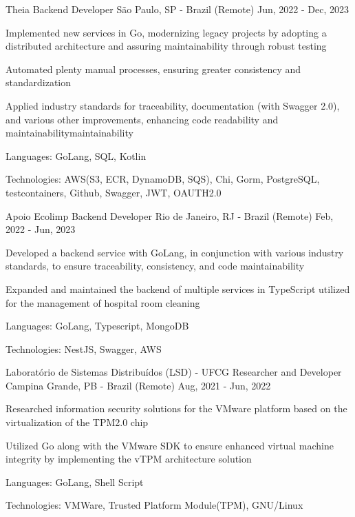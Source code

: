 
\begin{cventries}
  \cventry
  {Theia} %
  {Backend Developer} %
  {São Paulo, SP - Brazil (Remote)} %
  {Jun, 2022 - Dec, 2023} %
  {
    \begin{cvitems} %
      \item {Implemented new services in Go, modernizing legacy projects by adopting a distributed architecture and assuring maintainability through robust testing}
      \item {Automated plenty manual processes, ensuring greater consistency and standardization}
      \item {Applied industry standards for traceability, documentation (with Swagger 2.0), and various other improvements, enhancing code readability and maintainabilitymaintainability}
      \item {Languages: GoLang, SQL, Kotlin}
      \item {Technologies: AWS(S3, ECR, DynamoDB, SQS), Chi, Gorm, PostgreSQL, testcontainers, Github, Swagger, JWT, OAUTH2.0}
    \end{cvitems}
  }

  \cventry
  {Apoio Ecolimp} %
  {Backend Developer} %
  {Rio de Janeiro, RJ - Brazil (Remote)} %
  {Feb, 2022 - Jun, 2023} %
  {
    \begin{cvitems} %
      \item {Developed a backend service with GoLang, in conjunction with various industry standards, to ensure traceability, consistency, and code maintainability}
      \item {Expanded and maintained the backend of multiple services in TypeScript utilized for the management of hospital room cleaning}
      \item {Languages: GoLang, Typescript, MongoDB}
      \item {Technologies: NestJS, Swagger, AWS}
    \end{cvitems}
  }

  \cventry
  {Laboratório de Sistemas Distribuídos (LSD) - UFCG} %
  {Researcher and Developer} %
  {Campina Grande, PB - Brazil (Remote)} %
  {Aug, 2021 - Jun, 2022} %
  {
    \begin{cvitems} %
      \item {Researched information security solutions for the VMware platform based on the virtualization of the TPM2.0 chip}
      \item {Utilized Go along with the VMware SDK to ensure enhanced virtual machine integrity by implementing the vTPM architecture solution}
      \item {Languages: GoLang, Shell Script}
      \item {Technologies: VMWare, Trusted Platform Module(TPM), GNU/Linux}
    \end{cvitems}
  }


\end{cventries}

